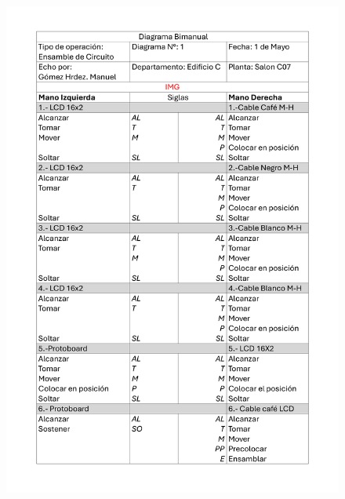     \begin{figure}[H]
        \centering
        \includegraphics[scale=0.25]{30/img/diagramaBimanualEnsamble-1.pdf}
    \end{figure}
